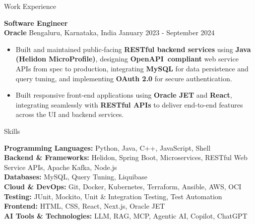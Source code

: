 \documentclass{resume}
\begin{document}
\begin{rSection}{Work Experience}
\vspace{6pt}

\textbf{Software Engineer} \\
\textbf{Oracle} \textbar{} Bengaluru, Karnataka, India \hspace*{\fill} January 2023 - September 2024
\vspace{-2pt}
\begin{itemize}
    \item Built and maintained public-facing \textbf{RESTful backend services} using \textbf{Java (Helidon MicroProfile)}, designing \textbf{OpenAPI~compliant} web service APIs from spec to production, integrating \textbf{MySQL} for data persistence and query tuning, and implementing \textbf{OAuth 2.0} for secure authentication.
    \item Built responsive front-end applications using \textbf{Oracle JET} and \textbf{React}, integrating seamlessly with \textbf{RESTful APIs} to deliver end-to-end features across the UI and backend services.
\end{itemize}

\end{rSection}

\begin{rSection}{Skills}

\vspace{-2pt}
\textbf{Programming Languages:} Python, Java, C++, JavaScript, Shell \\
\textbf{Backend \& Frameworks:} Helidon, Spring Boot, Microservices, RESTful Web Service APIs, Apache Kafka, Node.js \\
\textbf{Databases:} MySQL, Query Tuning, Liquibase \\
\textbf{Cloud \& DevOps:} Git, Docker, Kubernetes, Terraform, Ansible, AWS, OCI \\
\textbf{Testing:} JUnit, Mockito, Unit \& Integration Testing, Test Automation \\
\textbf{Frontend:} HTML, CSS, React, Next.js, Oracle JET \\
\textbf{AI Tools \& Technologies:} LLM, RAG, MCP, Agentic AI, Copilot, ChatGPT

\end{rSection}
\end{document}
